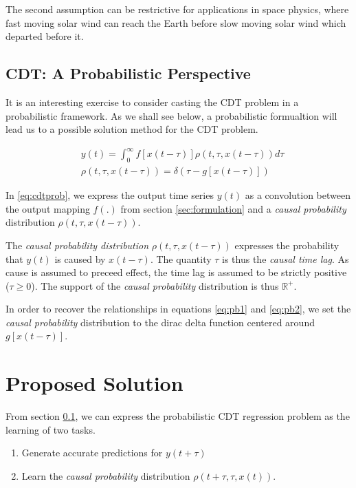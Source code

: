 \documentclass[runningheads]{llncs}
\begin{document}
The second assumption can be restrictive for applications in space physics, where fast moving 
solar wind can reach the Earth before slow moving solar wind which departed before it. 

\subsection{CDT: A Probabilistic Perspective}\label{sec:cdtprobform}

It is an interesting exercise to consider casting the CDT problem in a probabilistic framework.
As we shall see below, a probabilistic formualtion will lead us to a possible solution method
for the CDT problem. 

\begin{align} \label{eq:cdtprob}
      &y(t) = \int_{0}^{\infty}{f[x(t - \tau)] \rho(t, \tau, x(t - \tau))}d \tau \\
      & \nonumber \rho(t, \tau, x(t - \tau))  = \delta(\tau - g[x(t - \tau)])
\end{align}

In \ref{eq:cdtprob}, we express the output time series $y(t)$ as a convolution between
the output mapping $f(.)$ from section \ref{sec:formulation} and a \emph{causal probability}
distribution $\rho(t, \tau, x(t - \tau))$. 

The \emph{causal probability distribution} $\rho(t, \tau, x(t - \tau))$ expresses the probability 
that $y(t)$ is caused by $x(t - \tau)$. The quantity $\tau$ is thus the \emph{causal time lag}. 
As cause is assumed to preceed effect, the time lag is assumed to be strictly positive ($\tau \geq 0$). 
The support of the \emph{causal probability} distribution is thus $\mathbb{R}^+$.

In order to recover the relationships in equations \ref{eq:pb1} and \ref{eq:pb2}, we 
set the \emph{causal probability} distribution to the dirac delta function centered
around $g[x(t - \tau)]$.


\section{Proposed Solution}\label{sec:model}

From section \ref{sec:cdtprobform}, we can express the probabilistic CDT regression 
problem as the learning of two tasks.

\begin{enumerate}
    \item Generate accurate predictions for $y(t + \tau)$
    \item Learn the \emph{causal probability} distribution $\rho(t + \tau, \tau, x(t))$.
\end{enumerate}
\end{document}
